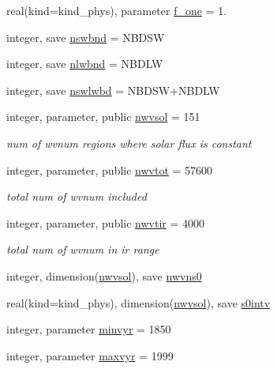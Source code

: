 \begin{DoxyCompactItemize}
\item 
real(kind=kind\+\_\+phys), parameter \hyperlink{namespacemodule__radiation__aerosols_a63babe7f9ec4ff6a0364993f4be3768e}{f\+\_\+one} = 1.
\item 
integer, save \hyperlink{namespacemodule__radiation__aerosols_a1d6c41e3bb818aa8b6f8f10d1c3f38a7}{nswbnd} = N\+B\+D\+SW
\item 
integer, save \hyperlink{namespacemodule__radiation__aerosols_ab17b7f75d6d737fd2fc81eae44cba81d}{nlwbnd} = N\+B\+D\+LW
\item 
integer, save \hyperlink{namespacemodule__radiation__aerosols_ab77b3b4aa76361277d828c7ba5dc3eda}{nswlwbd} = N\+B\+D\+SW+N\+B\+D\+LW
\item 
integer, parameter, public \hyperlink{namespacemodule__radiation__aerosols_a2e0dc6d161d1906050efd67c471673c9}{nwvsol} = 151
\begin{DoxyCompactList}\small\item\em num of wvnum regions where solar flux is constant \end{DoxyCompactList}\item 
integer, parameter, public \hyperlink{namespacemodule__radiation__aerosols_ae94df49c8ff8c0ec8e6b8adb891f3c6b}{nwvtot} = 57600
\begin{DoxyCompactList}\small\item\em total num of wvnum included \end{DoxyCompactList}\item 
integer, parameter, public \hyperlink{namespacemodule__radiation__aerosols_a45b2c26ccba5d4fd2dfccf31bcc02824}{nwvtir} = 4000
\begin{DoxyCompactList}\small\item\em total num of wvnum in ir range \end{DoxyCompactList}\item 
integer, dimension(\hyperlink{namespacemodule__radiation__aerosols_a2e0dc6d161d1906050efd67c471673c9}{nwvsol}), save \hyperlink{namespacemodule__radiation__aerosols_a80194c8356dfb92a43306abbe7097711}{nwvns0}
\item 
real(kind=kind\+\_\+phys), dimension(\hyperlink{namespacemodule__radiation__aerosols_a2e0dc6d161d1906050efd67c471673c9}{nwvsol}), save \hyperlink{namespacemodule__radiation__aerosols_aed8bb8a8bc26d72a6c3d31ed4430941f}{s0intv}
\item 
integer, parameter \hyperlink{namespacemodule__radiation__aerosols_ab37644d8cc2c222af700b86db91f05e7}{minvyr} = 1850
\item 
integer, parameter \hyperlink{namespacemodule__radiation__aerosols_ad856a3d564ff84043219626759673f27}{maxvyr} = 1999

\end{DoxyCompactItemize}
